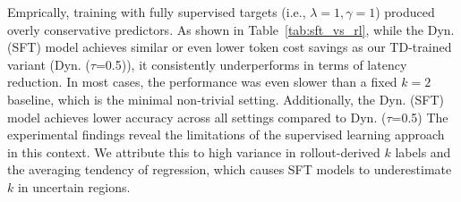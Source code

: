 Emprically, training with fully supervised targets (i.e., $\lambda = 1, \gamma = 1$) produced overly conservative predictors. As shown in Table~\ref{tab:sft_vs_rl}, while the Dyn. (SFT) model achieves similar or even lower token cost savings as our TD-trained variant (Dyn. ($\tau$=0.5)), it consistently underperforms in terms of latency reduction. In most cases, the performance was even slower than a fixed $k = 2$ baseline, which is the minimal non‑trivial setting. Additionally, the Dyn. (SFT) model achieves lower accuracy across all settings compared to Dyn. ($\tau$=0.5) The experimental findings reveal the limitations of the supervised learning approach in this context. We attribute this to high variance in rollout-derived $k$ labels and the averaging tendency of regression, which causes SFT models to underestimate $k$ in uncertain regions.

\begin{table}[hbtp]
    \caption{Performance comparison of SFT vs. RL strategies on the \textbf{OpenAGI} benchmark.}
    \label{tab:sft_vs_rl}
    \centering
\end{table}





